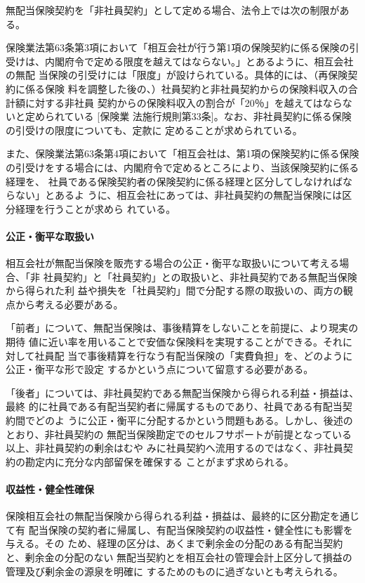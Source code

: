 \documentclass[report,gutter=10mm,fore-edge=10mm,uplatex,dvipdfmx]{jlreq}
\begin{document}
無配当保険契約を「非社員契約」として定める場合、法令上では次の制限がある。

保険業法第63条第3項において「相互会社が行う第1項の保険契約に係る保険の引
受けは、内閣府令で定める限度を越えてはならない。」とあるように、相互会社の無配
当保険の引受けには「限度」が設けられている。具体的には、（再保険契約に係る保険
料を調整した後の、）社員契約と非社員契約からの保険料収入の合計額に対する非社員
契約からの保険料収入の割合が「20％」を越えてはならないと定められている [保険業
法施行規則第33条]。なお、非社員契約に係る保険の引受けの限度についても、定款に
定めることが求められている。

また、保険業法第63条第4項において「相互会社は、第1項の保険契約に係る保険
の引受けをする場合には、内閣府令で定めるところにより、当該保険契約に係る経理を、
社員である保険契約者の保険契約に係る経理と区分してしなければならない」とあるよ
うに、相互会社にあっては、非社員契約の無配当保険には区分経理を行うことが求めら
れている。

\paragraph{公正・衡平な取扱い}

相互会社が無配当保険を販売する場合の公正・衡平な取扱いについて考える場合、「非
社員契約」と「社員契約」との取扱いと、非社員契約である無配当保険から得られた利
益や損失を「社員契約」間で分配する際の取扱いの、両方の観点から考える必要がある。

「前者」について、無配当保険は、事後精算をしないことを前提に、より現実の期待
値に近い率を用いることで安価な保険料を実現することができる。それに対して社員配
当で事後精算を行なう有配当保険の「実費負担」を、どのように公正・衡平な形で設定
するかという点について留意する必要がある。

「後者」については、非社員契約である無配当保険から得られる利益・損益は、最終
的に社員である有配当契約者に帰属するものであり、社員である有配当契約間でどのよ
うに公正・衡平に分配するかという問題もある。しかし、後述のとおり、非社員契約の
無配当保険勘定でのセルフサポートが前提となっている以上、非社員契約の剰余はむや
みに社員契約へ流用するのではなく、非社員契約の勘定内に充分な内部留保を確保する
ことがまず求められる。

\paragraph{収益性・健全性確保}

保険相互会社の無配当保険から得られる利益・損益は、最終的に区分勘定を通じて有
配当保険の契約者に帰属し、有配当保険契約の収益性・健全性にも影響を与える。その
ため、経理の区分は、あくまで剰余金の分配のある有配当契約と、剰余金の分配のない
無配当契約とを相互会社の管理会計上区分して損益の管理及び剰余金の源泉を明確に
するためのものに過ぎないとも考えられる。
\end{document}
